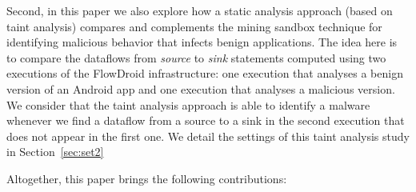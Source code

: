 

Second, in this paper we also explore how a static analysis approach
(based on taint analysis) compares and complements the mining sandbox technique
for identifying malicious behavior that infects benign applications.
The idea here is to compare the dataflows from \emph{source} to
\emph{sink} statements computed using two executions of the
FlowDroid infrastructure: one execution that analyses
a benign version of an Android app and one execution that
analyses a malicious version. We consider that
the taint analysis approach is able to identify a malware whenever
we find a dataflow from a source to a sink in the second execution
that does not appear in the first one. We detail the
settings of this taint analysis study in Section~\ref{sec:set2}

Altogether, this paper brings the following contributions:

